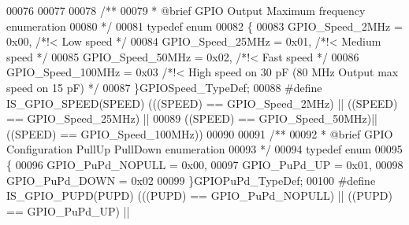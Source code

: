 \begin{DoxyCode}
00076 
00077 
00078 \textcolor{comment}{/** }
00079 \textcolor{comment}{  * @brief  GPIO Output Maximum frequency enumeration }
00080 \textcolor{comment}{  */}
00081 \textcolor{keyword}{typedef} \textcolor{keyword}{enum}
00082 \{
00083   GPIO_Speed_2MHz   = 0x00, \textcolor{comment}{/*!< Low speed */}
00084   GPIO_Speed_25MHz  = 0x01, \textcolor{comment}{/*!< Medium speed */}
00085   GPIO_Speed_50MHz  = 0x02, \textcolor{comment}{/*!< Fast speed */}
00086   GPIO_Speed_100MHz = 0x03  \textcolor{comment}{/*!< High speed on 30 pF (80 MHz Output max speed on 15 pF) */}
00087 \}GPIOSpeed\_TypeDef;
00088 \textcolor{preprocessor}{#}\textcolor{preprocessor}{define} \textcolor{preprocessor}{IS\_GPIO\_SPEED}\textcolor{preprocessor}{(}\textcolor{preprocessor}{SPEED}\textcolor{preprocessor}{)} \textcolor{preprocessor}{(}\textcolor{preprocessor}{(}\textcolor{preprocessor}{(}\textcolor{preprocessor}{SPEED}\textcolor{preprocessor}{)} \textcolor{preprocessor}{==} \textcolor{preprocessor}{GPIO\_Speed\_2MHz}\textcolor{preprocessor}{)} \textcolor{preprocessor}{||} \textcolor{preprocessor}{(}\textcolor{preprocessor}{(}\textcolor{preprocessor}{SPEED}\textcolor{preprocessor}{)} \textcolor{preprocessor}{==} \textcolor{preprocessor}{GPIO\_Speed\_25MHz}\textcolor{preprocessor}{)} \textcolor{preprocessor}{||}
00089                               \textcolor{preprocessor}{(}\textcolor{preprocessor}{(}\textcolor{preprocessor}{SPEED}\textcolor{preprocessor}{)} \textcolor{preprocessor}{==} \textcolor{preprocessor}{GPIO\_Speed\_50MHz}\textcolor{preprocessor}{)}\textcolor{preprocessor}{||}  \textcolor{preprocessor}{(}\textcolor{preprocessor}{(}\textcolor{preprocessor}{SPEED}\textcolor{preprocessor}{)} \textcolor{preprocessor}{==} \textcolor{preprocessor}{GPIO\_Speed\_100MHz}\textcolor{preprocessor}{)}\textcolor{preprocessor}{)}
00090 
00091 \textcolor{comment}{/** }
00092 \textcolor{comment}{  * @brief  GPIO Configuration PullUp PullDown enumeration }
00093 \textcolor{comment}{  */}
00094 \textcolor{keyword}{typedef} \textcolor{keyword}{enum}
00095 \{
00096   GPIO_PuPd_NOPULL = 0x00,
00097   GPIO_PuPd_UP     = 0x01,
00098   GPIO_PuPd_DOWN   = 0x02
00099 \}GPIOPuPd\_TypeDef;
00100 \textcolor{preprocessor}{#}\textcolor{preprocessor}{define} \textcolor{preprocessor}{IS\_GPIO\_PUPD}\textcolor{preprocessor}{(}\textcolor{preprocessor}{PUPD}\textcolor{preprocessor}{)} \textcolor{preprocessor}{(}\textcolor{preprocessor}{(}\textcolor{preprocessor}{(}\textcolor{preprocessor}{PUPD}\textcolor{preprocessor}{)} \textcolor{preprocessor}{==} \textcolor{preprocessor}{GPIO\_PuPd\_NOPULL}\textcolor{preprocessor}{)} \textcolor{preprocessor}{||} \textcolor{preprocessor}{(}\textcolor{preprocessor}{(}\textcolor{preprocessor}{PUPD}\textcolor{preprocessor}{)} \textcolor{preprocessor}{==} \textcolor{preprocessor}{GPIO\_PuPd\_UP}\textcolor{preprocessor}{)} \textcolor{preprocessor}{||}

\end{DoxyCode}
